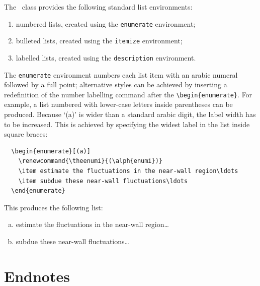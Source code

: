 The \cambridge\ class provides the following standard list environments:
\begin{enumerate}
 \item numbered lists, created using the \verb"enumerate" environment;
 \item bulleted lists, created using the \verb"itemize" environment;
 \item labelled lists, created using the \verb"description" environment.
\end{enumerate}
The \verb"enumerate" environment numbers each list item with an arabic numeral followed by a full point; alternative styles can be achieved by inserting a redefinition of the number labelling command after the \verb"\begin{enumerate}". For example, a list numbered with lower-case letters inside parentheses can be produced. Because `(a)' is wider than a standard arabic digit, the label width has to be increased. This is achieved by specifying the widest label in the list inside square braces:
\begin{verbatim}
  \begin{enumerate}[(a)]
    \renewcommand{\theenumi}{(\alph{enumi})}
    \item estimate the fluctuations in the near-wall region\ldots
    \item subdue these near-wall fluctuations\ldots
  \end{enumerate}
\end{verbatim}
This produces the following list:
  \begin{enumerate}[(a)]
    \renewcommand{\theenumi}{(\alph{enumi})}
    \item estimate the fluctuations in the near-wall region\ldots
    \item subdue these near-wall fluctuations\ldots
  \end{enumerate}


\section{Endnotes}

